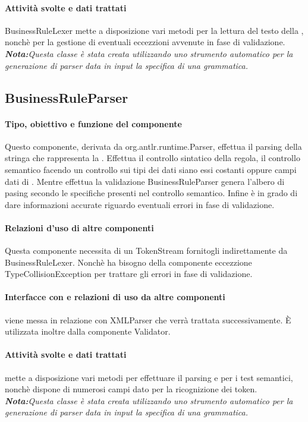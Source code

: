 \documentclass[11pt,titlepage,a4paper]{report}
\begin{document}
\paragraph{Attivit\`a svolte e dati trattati}
BusinessRuleLexer mette a disposizione vari metodi per la lettura del testo della \br, nonch\`e per la gestione di eventuali eccezzioni avvenute in fase di validazione.
\textit{\textbf{Nota:}Questa classe \`e stata creata utilizzando uno strumento automatico per la generazione di parser data in input la specifica di una grammatica.}

\subsection{BusinessRuleParser}
\paragraph{Tipo, obiettivo e funzione del componente}
Questo componente, derivata da org.antlr.runtime.Parser, effettua il parsing della stringa che rappresenta la \br. Effettua il controllo sintatico della regola, il controllo semantico facendo un controllo sui tipi dei dati siano essi costanti oppure campi dati di \bos. Mentre effettua la validazione BusinessRuleParser genera l'albero di pasing secondo le specifiche presenti nel controllo semantico. Infine \`e in grado di dare informazioni accurate 
riguardo eventuali errori in fase di validazione.
\paragraph{Relazioni d'uso di altre componenti}
Questa componente necessita di un TokenStream fornitogli indirettamente da BusinessRuleLexer. Nonchè ha bisogno della componente eccezzione TypeCollisionException per trattare gli errori in fase di validazione.
\paragraph{Interfacce con e relazioni di uso da altre componenti}
\brp viene messa in relazione con XMLParser che verr\`a trattata successivamente.
\`E utilizzata inoltre dalla componente Validator.
\paragraph{Attivit\`a svolte e dati trattati}
\brp mette a disposizione vari metodi per effettuare il parsing e per i test semantici, nonch\`e dispone di numerosi campi dato per la ricognizione dei token.
\textit{\textbf{Nota:}Questa classe \`e stata creata utilizzando uno strumento automatico per la generazione di parser data in input la specifica di una grammatica.}
\end{document}
